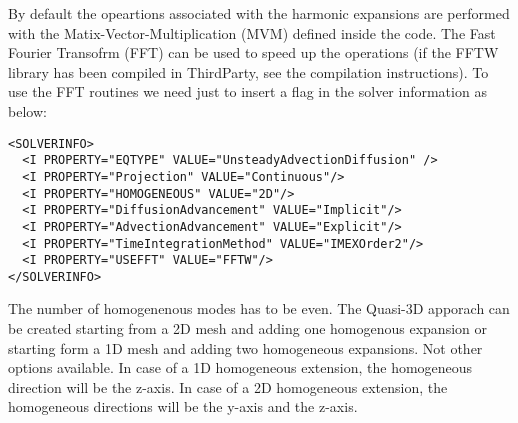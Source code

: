 By default the opeartions associated with the harmonic expansions are performed
with the Matix-Vector-Multiplication (MVM) defined inside the code. The Fast
Fourier Transofrm (FFT) can be used to speed up the operations (if the FFTW
library has been compiled in ThirdParty, see the compilation instructions). To
use the FFT routines we need just to insert a flag in the solver information as
below:

\begin{lstlisting}[style=XMLStyle]
<SOLVERINFO>
  <I PROPERTY="EQTYPE" VALUE="UnsteadyAdvectionDiffusion" />
  <I PROPERTY="Projection" VALUE="Continuous"/>
  <I PROPERTY="HOMOGENEOUS" VALUE="2D"/>
  <I PROPERTY="DiffusionAdvancement" VALUE="Implicit"/>
  <I PROPERTY="AdvectionAdvancement" VALUE="Explicit"/>
  <I PROPERTY="TimeIntegrationMethod" VALUE="IMEXOrder2"/>
  <I PROPERTY="USEFFT" VALUE="FFTW"/>
</SOLVERINFO>
\end{lstlisting}

The number of homogenenous modes has to be even. The Quasi-3D apporach can be
created starting from a 2D mesh and adding one homogenous expansion or starting
form a 1D mesh and adding two homogeneous expansions. Not other options
available. In case of a 1D homogeneous extension, the homogeneous direction will
be the z-axis. In case of a 2D homogeneous extension, the homogeneous directions
will be the y-axis and the z-axis.

